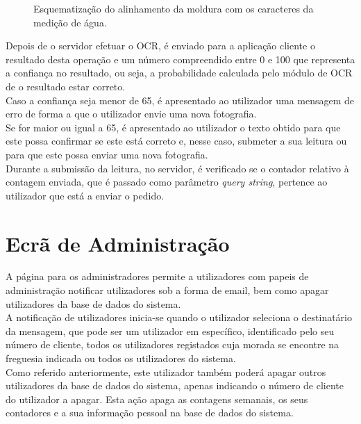 \begin{figure}[h!]
\begin{center}
\caption{Esquematização do alinhamento da moldura com os caracteres da medição de água.}
\label{fig:moldura}
\end{center}
\end{figure}

Depois de o servidor efetuar o OCR, é enviado para a aplicação cliente o resultado desta operação e um número compreendido entre 0 e 100 que representa a confiança no resultado, ou seja, a probabilidade calculada pelo módulo de OCR de o resultado estar correto.\\
Caso a confiança seja menor de 65, é apresentado ao utilizador uma mensagem de erro de forma a que o utilizador envie uma nova fotografia.\\
Se for maior ou igual a 65, é apresentado ao utilizador o texto obtido para que este possa confirmar se este está correto e, nesse caso, submeter a sua leitura ou para que este possa enviar uma nova fotografia.\\
Durante a submissão da leitura, no servidor, é verificado se o contador relativo à contagem enviada, que é passado como parâmetro \textit{query string}, pertence ao utilizador que está a enviar o pedido.

\section{Ecrã de Administração} \label{ecra:admin} %
A página para os administradores permite a utilizadores com papeis de administração notificar utilizadores sob a forma de email, bem como apagar utilizadores da base de dados do sistema.\\
A notificação de utilizadores inicia-se quando o utilizador seleciona o destinatário da mensagem, que pode ser um utilizador em específico, identificado pelo seu número de cliente, todos os utilizadores registados cuja morada se encontre na freguesia indicada ou todos os utilizadores do sistema.\\
Como referido anteriormente, este utilizador também poderá apagar outros utilizadores da base de dados do sistema, apenas indicando o número de cliente do utilizador a apagar. Esta ação apaga as contagens semanais, os seus contadores e a sua informação pessoal na base de dados do sistema.




















